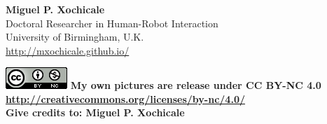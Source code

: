 \documentclass{beamer}
\begin{document}
% 
% 
% 
% 






\begin{frame}
\frametitle{}

\vspace{2cm}

\vspace{1cm}

\normalsize 
\textbf{Miguel P. Xochicale} \\
Doctoral Researcher in Human-Robot Interaction \\
University of Birmingham, U.K. \\ 
{\color{blue} \href{http://mxochicale.github.io/}{http://mxochicale.github.io/ } } \\

   
\vspace{1cm}


\includegraphics[scale=.4]{CC4}
\tiny{ 
\textbf{My own pictures are release under CC BY-NC 4.0
{\color{blue} \href{http://creativecommons.org/licenses/by-nc/4.0/}{http://creativecommons.org/licenses/by-nc/4.0/} } \\
Give credits to: Miguel P. Xochicale
}
}

\end{frame}




% 
\end{document}
